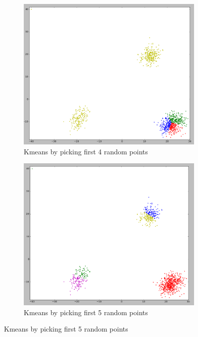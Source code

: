 \begin{figure}
  \begin{subfigure}{.33\textwidth}
    \centering
    \includegraphics[width=\textwidth]{shots/clusters-random-4}
    \caption{Kmeans by picking first 4 random points}
    \label{1-trilinear-compositing}
  \end{subfigure}
  \begin{subfigure}{.33\textwidth}
    \centering
    \includegraphics[width=\textwidth]{shots/clusters-random-5}
    \caption{Kmeans by picking first 5 random points}
    \label{1-trilinear-compositing}
  \end{subfigure}

\end{figure}
